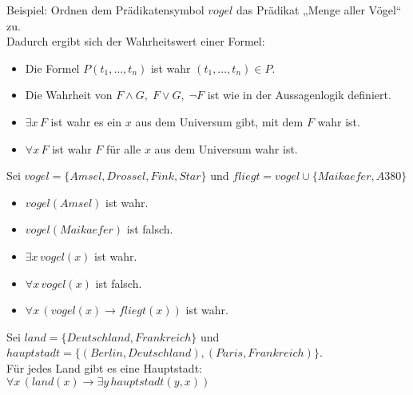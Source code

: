 Beispiel: Ordnen dem Prädikatensymbol $vogel$ das Prädikat „Menge aller Vögel“ zu.\\
Dadurch ergibt sich der Wahrheitswert einer Formel: 
\begin{itemize}
\item Die Formel $P(t_1, \dots, t_n)$ ist wahr \gdw{} $(t_1, \dots, t_n) \in P$.
\item Die Wahrheit von $F\wedge G, \; F\vee G,\; \neg F$ ist wie in der Aussagenlogik definiert.
\item $\exists x \, F$ ist wahr \gdw{} es ein $x$ aus dem Universum gibt, mit dem $F$ wahr ist.
\item $\forall x \, F$ ist wahr \gdw{} $F$ für alle $x$ aus dem Universum wahr ist.
\end{itemize}
Sei $vogel=\{Amsel, Drossel, Fink, Star\}$ und $fliegt=vogel \cup \{Maikaefer, A380\}$
\begin{itemize}
\item $vogel(Amsel)$ ist wahr.
\item $vogel(Maikaefer)$ ist falsch.
\item $\exists x \, vogel(x)$ ist wahr.
\item $\forall x \, vogel(x)$ ist falsch.
\item $\forall x \,(vogel(x) \to fliegt(x))$ ist wahr.
\end{itemize}

 Sei $land=\{Deutschland, Frankreich\}$ und \\
$hauptstadt = \{ (Berlin, Deutschland), (Paris, Frankreich) \}$.\\
Für jedes Land gibt es eine Hauptstadt:\\
$\forall x \,(land(x)\to \exists y \, hauptstadt(y,x))$







